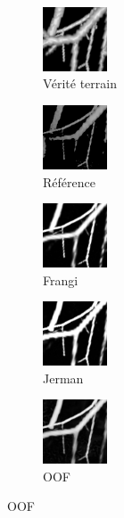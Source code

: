   \begin{figure}[H]
    \centering
    \begin{subfigure}[t]{0.25\textwidth}
      \includegraphics[clip = true, trim  =  170 230 150 240, width=19.0mm]{Images/Vascu_2_k_GT.png}
      \caption{Vérité terrain}
    \end{subfigure}
    \begin{subfigure}[t]{0.25\textwidth}
      \includegraphics[clip = true, trim  =  170 230 150 240, width=19.0mm]{Images/Vascu_2_k_Baseline.png}
      \caption{Référence}
    \end{subfigure}
    \begin{subfigure}[t]{0.25\textwidth}
      \includegraphics[clip = true, trim  =  170 230 150 240, width=19.0mm]{Images/Vascu_2_k_Frangi.png}
      \caption{Frangi}
    \end{subfigure}
    \begin{subfigure}[t]{0.25\textwidth}
      \includegraphics[clip = true, trim  =  170 230 150 240, width=19.0mm]{Images/Vascu_2_k_Jerman.png}
      \caption{Jerman}
    \end{subfigure}
    \begin{subfigure}[t]{0.25\textwidth}
      \includegraphics[clip = true, trim  =  170 230 150 240, width=19.0mm]{Images/Vascu_2_k_OOF_GM.png}
      \caption{OOF}
    \end{subfigure}

\end{figure}
